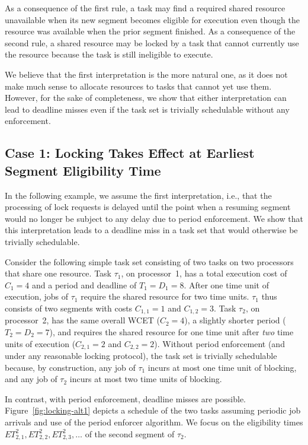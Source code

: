 As a consequence of the first rule, a task may find a required shared resource unavailable when its new segment becomes eligible for execution even though the resource was available when the prior segment finished.  As a consequence of the second rule, a shared resource may be locked by a task that cannot currently use the resource  because the task is still ineligible to execute.

We believe that the first interpretation is the more natural one, as it does not make much sense to allocate resources to tasks that cannot yet use them. However, for the sake of completeness, we show that either interpretation can lead to deadline misses even if the task set is trivially schedulable without any enforcement.

\subsection{Case 1: Locking Takes Effect at Earliest Segment Eligibility Time}
In the following example, we assume the first interpretation, i.e., that the processing of lock requests is delayed until the point when a resuming segment would no longer be subject to any delay due to period enforcement. We show that this interpretation leads to a deadline miss in a task set that would otherwise be trivially schedulable.

Consider the following simple task set consisting of two tasks on two processors that share one resource. Task $\tau_1$, on processor~1, has a total execution cost of $C_1 = 4$ and a period and deadline of $T_1 = D_1 = 8$. After one time unit of execution, jobs of $\tau_1$ require the shared resource for two time units. $\tau_1$ thus consists of two segments with costs $C_{1,1} = 1$ and $C_{1,2} = 3$. Task $\tau_2$, on processor~2, has the same overall WCET ($C_2 = 4$), a slightly shorter period ($T_2 = D_2 = 7$), and requires the shared resource for one time unit after \emph{two} time units of execution ($C_{2,1} = 2$ and $C_{2,2} = 2$). Without period enforcement (and under any reasonable locking protocol), the task set is trivially schedulable because, by construction, any job of $\tau_1$ incurs at most one time unit of blocking, and any job of $\tau_2$ incurs at most two time units of blocking.

In contrast, with period enforcement, deadline misses are possible.
Figure~\ref{fig:locking-alt1} depicts a schedule of the two tasks assuming periodic job arrivals and use of the period enforcer algorithm. We focus on the eligibility times $ET_{2,1}^2,ET_{2,2}^2,ET_{2,3}^2,\ldots$ of the second segment of $\tau_2$.

